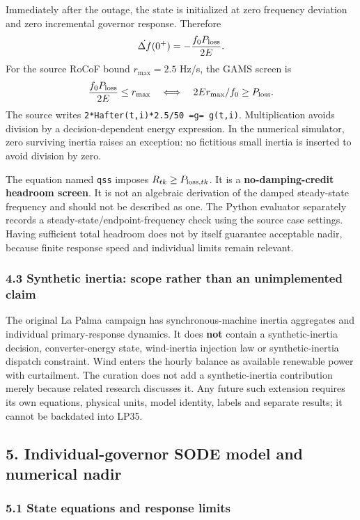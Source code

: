 \documentclass[
  11pt,
  a4paper,
]{article}
\begin{document}
Immediately after the outage, the state is initialized at zero frequency
deviation and zero incremental governor response. Therefore \[
\dot{\Delta f}(0^+)=-\frac{f_0P_{\rm loss}}{2E}.
\] For the source RoCoF bound \(r_{\max}=2.5\) Hz/s, the GAMS screen is
\[
\frac{f_0P_{\rm loss}}{2E}\le r_{\max}
\quad\Longleftrightarrow\quad
2Er_{\max}/f_0\ge P_{\rm loss}.
\] The source writes \texttt{2*Hafter(t,i)*2.5/50\ =g=\ g(t,i)}.
Multiplication avoids division by a decision-dependent energy
expression. In the numerical simulator, zero surviving inertia raises an
exception: no fictitious small inertia is inserted to avoid division by
zero.

The equation named \texttt{qss} imposes \(R_{tk}\ge P_{{\rm loss},tk}\).
It is a \textbf{no-damping-credit headroom screen}. It is not an
algebraic derivation of the damped steady-state frequency and should not
be described as one. The Python evaluator separately records a
steady-state/endpoint-frequency check using the source case settings.
Having sufficient total headroom does not by itself guarantee acceptable
nadir, because finite response speed and individual limits remain
relevant.

\subsubsection{4.3 Synthetic inertia: scope rather than an unimplemented
claim}\label{synthetic-inertia-scope-rather-than-an-unimplemented-claim}

The original La Palma campaign has synchronous-machine inertia
aggregates and individual primary-response dynamics. It does
\textbf{not} contain a synthetic-inertia decision, converter-energy
state, wind-inertia injection law or synthetic-inertia dispatch
constraint. Wind enters the hourly balance as available renewable power
with curtailment. The curation does not add a synthetic-inertia
contribution merely because related research discusses it. Any future
such extension requires its own equations, physical units, model
identity, labels and separate results; it cannot be backdated into LP35.

\subsection{5. Individual-governor SODE model and numerical
nadir}\label{individual-governor-sode-model-and-numerical-nadir}

\subsubsection{5.1 State equations and response
limits}\label{state-equations-and-response-limits}
\end{document}
